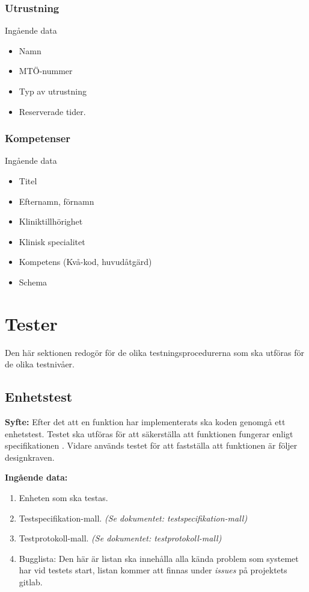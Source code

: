 \documentclass[a4paper,10pt]{article}
\begin{document}
\subsubsection{Utrustning}
Ingående data
\begin{itemize}
	\item Namn
	\item MTÖ-nummer
	\item Typ av utrustning
	\item Reserverade tider.
\end{itemize}

\subsubsection{Kompetenser}
Ingående data
\begin{multicols}{2}
\begin{itemize}
	\item Titel
	\item Efternamn, förnamn
	\item Kliniktillhörighet
	\item Klinisk specialitet
	\item Kompetens (Kvå-kod, huvudåtgärd)
	\item Schema
\end{itemize}
\end{multicols}


\section{Tester}
Den här sektionen redogör för de olika testningsprocedurerna som ska utföras för de olika testnivåer.

\subsection{Enhetstest}
\label{sec:Enhetstest}
  \textbf{Syfte:}
  Efter det att en funktion har implementerats ska koden genomgå ett enhetstest. Testet ska utföras för att säkerställa att funktionen fungerar enligt specifikationen \cite{kravspec}. Vidare används testet för att fastställa att funktionen är följer designkraven.

  \textbf{Ingående data:}
        \begin{enumerate}
            \item Enheten som ska testas.
            \item Testspecifikation-mall. \emph{(Se dokumentet: testspecifikation-mall)}
            \item Testprotokoll-mall. \emph{(Se dokumentet: testprotokoll-mall)}
            \item Bugglista: Den här är listan ska innehålla alla kända problem som systemet har vid testets start, listan kommer att finnas under \emph{issues} på projektets gitlab.
        \end{enumerate}
\end{document}
